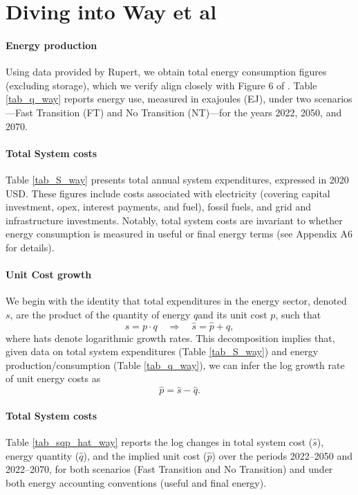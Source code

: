 \documentclass[11pt]{article}
\begin{document}
\section{Diving into Way et al}

\paragraph{Energy production} Using data provided by Rupert, we obtain total energy consumption figures (excluding storage), which we verify align closely with Figure 6 of \cite{wayEmpiricallyGroundedTechnology2022}. Table \ref{tab_q_way} reports energy use, measured in exajoules (EJ), under two scenarios—Fast Transition (FT) and No Transition (NT)—for the years 2022, 2050, and 2070.

\paragraph{Total System costs} Table \ref{tab_S_way} presents total annual system expenditures, expressed in 2020 USD. These figures include costs associated with electricity (covering capital investment, opex, interest payments, and fuel), fossil fuels, and grid and infrastructure investments. Notably, total system costs are invariant to whether energy consumption is measured in useful or final energy terms (see Appendix A6 for details).

\paragraph{Unit Cost growth} 
We begin with the identity that total expenditures in the energy sector, denoted $s$, are the product of the quantity of energy $q$and its unit cost $p$, such that
\begin{equation}
s = p \cdot q \quad \Rightarrow \quad \hat{s} = \hat{p} + \hat{q},
\end{equation}
where hats denote logarithmic growth rates. This decomposition implies that, given data on total system expenditures (Table \ref{tab_S_way}) and energy production/consumption (Table \ref{tab_q_way}), we can infer the log growth rate of unit energy costs as
\begin{equation}
\hat{p} = \hat{s} - \hat{q}.
\end{equation}

\paragraph{Total System costs} 
Table \ref{tab_sqp_hat_way} reports the log changes in total system cost ($\hat{s}$), energy quantity ($\hat{q}$), and the implied unit cost ($\hat{p}$) over the periods 2022--2050 and 2022--2070, for both scenarios (Fast Transition and No Transition) and under both energy accounting conventions (useful and final energy). 
\end{document}
